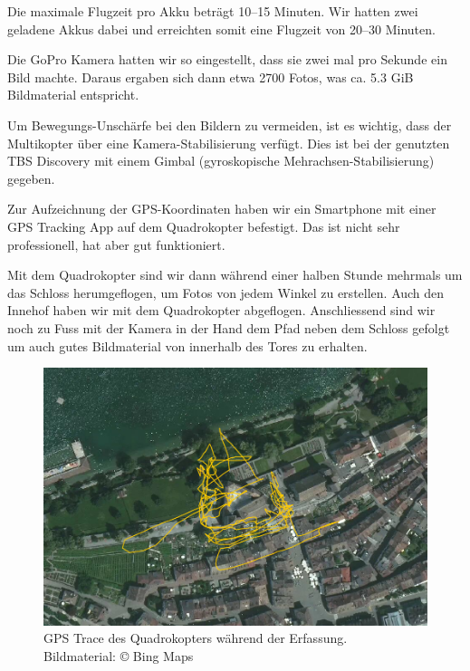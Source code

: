 Die maximale Flugzeit pro Akku beträgt 10--15 Minuten. Wir hatten zwei geladene
Akkus dabei und erreichten somit eine Flugzeit von 20--30 Minuten.

Die GoPro Kamera hatten wir so eingestellt, dass sie zwei mal pro Sekunde ein
Bild machte. Daraus ergaben sich dann etwa 2700 Fotos, was ca. 5.3 GiB
Bildmaterial entspricht.

Um Bewegungs-Unschärfe bei den Bildern zu vermeiden, ist es wichtig, dass der
Multikopter über eine Kamera-Stabilisierung verfügt. Dies ist bei der genutzten
TBS Discovery mit einem Gimbal (gyroskopische Mehrachsen-Stabilisierung)
gegeben.

Zur Aufzeichnung der GPS-Koordinaten haben wir ein Smartphone mit einer GPS
Tracking App auf dem Quadrokopter befestigt. Das ist nicht sehr professionell,
hat aber gut funktioniert.

Mit dem Quadrokopter sind wir dann während einer halben Stunde mehrmals um das
Schloss herumgeflogen, um Fotos von jedem Winkel zu erstellen. Auch den Innehof
haben wir mit dem Quadrokopter abgeflogen. Anschliessend sind wir noch zu Fuss
mit der Kamera in der Hand dem Pfad neben dem Schloss gefolgt um auch gutes
Bildmaterial von innerhalb des Tores zu erhalten.

\vspace{1\baselineskip}

\begin{figure}[H]
	\centering
	\includegraphics[width=\textwidth]{images/gpstrace_satellite.png}
	\caption{GPS Trace des Quadrokopters während der Erfassung.\\Bildmaterial:
		\copyright{} Bing Maps}
	\label{img:gpstrace-satellite}
\end{figure}

